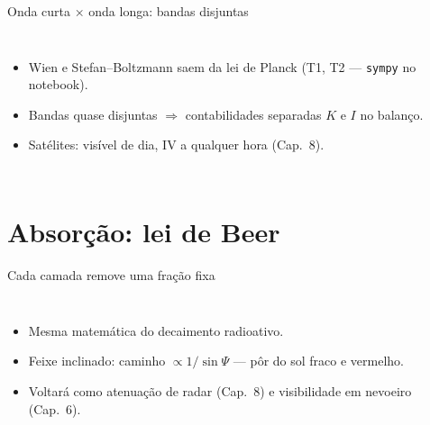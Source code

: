 \documentclass[aspectratio=169,11pt]{beamer}
\begin{document}
\begin{frame}{Onda curta × onda longa: bandas disjuntas}
  \begin{columns}
    \vspace{0.4em}
    \begin{itemize}
      \item Wien e Stefan--Boltzmann saem da lei de Planck (T1, T2 —
            \texttt{sympy} no notebook).
      \item Bandas quase disjuntas $\Rightarrow$ contabilidades separadas
            $K$ e $I$ no balanço.
      \item Satélites: visível de dia, IV a qualquer hora (Cap.~8).
    \end{itemize}
  \end{columns}
\end{frame}

\section{Absorção: lei de Beer}

\begin{frame}{Cada camada remove uma fração fixa}
  \begin{columns}
    \vspace{0.4em}
    \begin{itemize}
      \item Mesma matemática do decaimento radioativo.
      \item Feixe inclinado: caminho $\propto 1/\sin\Psi$ — pôr do sol
            fraco e vermelho.
      \item Voltará como atenuação de radar (Cap.~8) e visibilidade em
            nevoeiro (Cap.~6).
    \end{itemize}
  \end{columns}
\end{frame}
\end{document}
